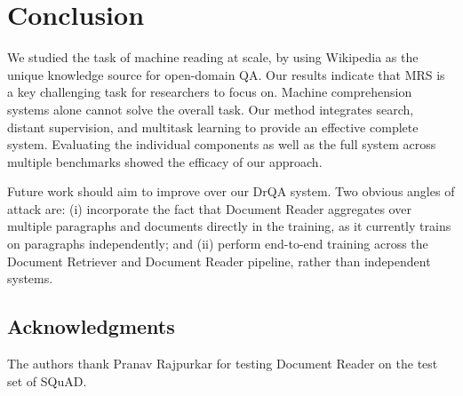 \documentclass[11pt,a4paper]{article}
\newcommand\squad{SQuAD\xspace}
\newcommand\curq{CuratedTREC-S\xspace}
\newcommand\lcurq{CuratedTREC\xspace}
\newcommand\wikim{WikiMovies\xspace}
\newcommand\wq{WebQuestions\xspace}
\newcommand\us{DrQA\xspace}
\begin{document}


\section{Conclusion} \label{sec:conc}

We studied the task of machine reading at scale, by using Wikipedia as the unique knowledge source for open-domain QA. Our results indicate that MRS is a key challenging task for researchers to focus on. Machine comprehension systems alone cannot solve the overall task. Our method integrates search,
distant supervision, and multitask learning to provide an effective complete system.
Evaluating the individual components as well as the full system across multiple benchmarks showed the efficacy of our approach.

Future work should aim to improve over our \us system.
Two obvious angles of attack are:  (i) incorporate the fact that Document Reader aggregates over multiple paragraphs and documents directly in the training, as it currently trains on paragraphs independently; and (ii) perform end-to-end training across the Document Retriever and Document Reader pipeline, rather than independent systems.


\subsection*{Acknowledgments}
The authors thank Pranav Rajpurkar for testing Document Reader on the test set of SQuAD.

%
%


\end{document}
